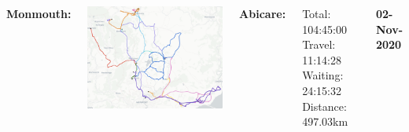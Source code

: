 \documentclass[usenames,dvipsnames]{beamer}
\begin{document}

\begin{frame} %
	\begin{columns}
		\begin{minipage}[c][0.05\textheight][c]{\linewidth}
			\hspace{35mm}
			\textbf{Monmouth:}
		\end{minipage}
		\begin{minipage}[c][0.7\textheight][c]{\linewidth}
			\centering
			\includegraphics[width=1\linewidth]{figures/02MonmouthAbi}
		\end{minipage}
		\begin{minipage}[c][0.2\textheight][c]{\linewidth}
			\scriptsize
			\hspace{17mm}\textbf{Abicare:}
			\begin{itemize}
				\setlength{\itemindent}{0.5in}
				\aitem Total: 104:45:00
				\aitem Travel: 11:14:28
				\aitem Waiting: 24:15:32
				\aitem Distance: 497.03km
			\end{itemize}
		\vspace{10mm}
		\end{minipage}
		\begin{minipage}[c][0.05\textheight][c]{\linewidth}
			\textbf{02-Nov-2020}
		\end{minipage}
		\begin{minipage}[c][0.7\textheight][c]{\linewidth}
			\centering

\end{minipage}
\end{columns}
\end{frame}
\end{document}
